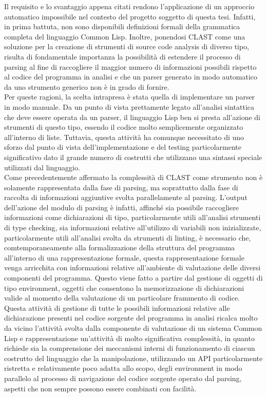 Il requisito e lo svantaggio appena citati rendono l’applicazione di un
approccio automatico impossibile nel contesto del progetto soggetto di questa
tesi. Infatti, in prima battuta, non sono disponibili definizioni formali
della grammatica completa del linguaggio Common Lisp. Inoltre, ponendosi CLAST
come una soluzione per la creazione di strumenti di source code analysis di
diverso tipo, risulta di fondamentale importanza la possibilità di estendere
il processo di parsing al fine di raccogliere il maggior numero di
informazioni possibili rispetto al codice del programma in analisi e che un
parser generato in modo automatico da uno strumento generico non è in grado di
fornire.\\

Per queste ragioni, la scelta intrapresa è stata quella di implementare un
parser in modo manuale. Da un punto di vista prettamente legato all’analisi
sintattica che deve essere operata da un parser, il linguaggio Lisp ben si
presta all’azione di strumenti di questo tipo, essendo il codice molto
semplicemente organizzato all’interno di liste. Tuttavia, questa attività ha
comunque necessitato di uno sforzo dal punto di vista dell’implementazione e
del testing particolarmente significativo dato il grande numero di costrutti
che utilizzano una sintassi speciale utilizzati dal linguaggio.\\

Come precedentemente affermato la complessità di CLAST come strumento non è
solamente rappresentata dalla fase di parsing, ma soprattutto dalla fase di
raccolta di informazioni aggiuntive svolta parallelamente al parsing. L’output
dell’azione del modulo di parsing è infatti, affinché sia possibile
raccogliere informazioni come dichiarazioni di tipo, particolarmente utili
all'analisi strumenti di type checking, sia informazioni relative all’utilizzo
di variabili non inizializzate, particolarmente utili all’analisi svolta da
strumenti di linting, è necessario che, comtemporaneamente alla
formalizzazione della struttura del programma all’interno di una
rappresentazione formale, questa rappresentazione formale venga arricchita con
informazioni relative all’ambiente di valutazione delle diversi componenti del
programma. Questo viene fatto a partire dal gestione di oggetti di tipo
environment, oggetti che consentono la memorizzazione di dichiarazioni valide
al momento della valutazione di un particolare frammento di codice. Questa
attività di gestione di tutte le possibili informazioni relative alle
dichiarazione presenti nel codice sorgente del programma in analisi ricalca
molto da vicino l’attività svolta dalla componente di valutazione di un
sistema Common Lisp e rappresentazione un’attività di molto significativa
complessità, in quanto richiede sia la comprensione dei meccanismi interni di
funzionamento di ciascun costrutto del linguaggio che la manipolazione,
utilizzando un API particolarmente ristretta e relativamente poco adatta allo
scopo, degli environment in modo parallelo al processo di navigazione del
codice sorgente operato dal parsing, aspetti che non sempre possono essere
combinati con facilità.

